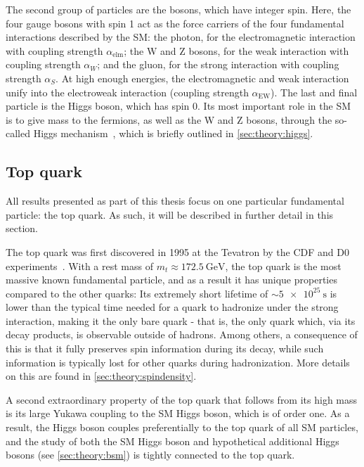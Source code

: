 The second group of particles are the bosons, which have integer spin. Here, the four gauge bosons with spin 1 act as the force carriers of the four fundamental interactions described by the SM: the photon, for the electromagnetic interaction with coupling strength $\alpha_{\mathrm{elm}}$; the W and Z bosons, for the weak interaction with coupling strength $\alpha_W$; and the gluon, for the strong interaction with coupling strength $\alpha_S$. At high enough energies, the electromagnetic and weak interaction unify into the electroweak interaction (coupling strength $\alpha_{\mathrm{EW}}$). The last and final particle is the Higgs boson, which has spin 0. Its most important role in the SM is to give mass to the fermions, as well as the W and Z bosons, through the so-called Higgs mechanism~\cite{Higgs:1964ia,Englert:1964et}, which is briefly outlined in \cref{sec:theory:higgs}.

\subsection{Top quark}

All results presented as part of this thesis focus on one particular fundamental particle: the top quark. As such, it will be described in further detail in this section.

The top quark was first discovered in 1995 at the Tevatron by the CDF and D0 experiments~\cite{CDF:1995wbb,D0:1995jca}. With a rest mass of $m_t \approx \SI{172.5}{\GeV}$, the top quark is the most massive known fundamental particle, and as a result it has unique properties compared to the other quarks: Its extremely short lifetime of $\sim \SI{5e25}{\s}$ is lower than the typical time needed for a quark to hadronize under the strong interaction, making it the only bare quark - that is, the only quark which,  via its decay products, is observable outside of hadrons. Among others, a consequence of this is that it fully preserves spin information during its decay, while such information is typically lost for other quarks during hadronization. More details on this are found in \cref{sec:theory:spindensity}.

A second extraordinary property of the top quark that follows from its high mass is its large Yukawa coupling to the SM Higgs boson, which is of order one. As a result, the Higgs boson couples preferentially to the top quark of all SM particles, and the study of both the SM Higgs boson and hypothetical additional Higgs bosons (see \cref{sec:theory:bsm}) is tightly connected to the top quark. 


